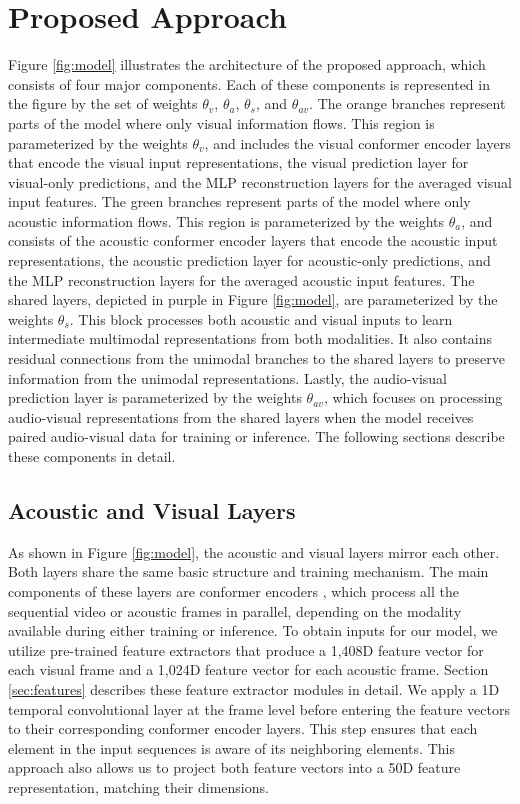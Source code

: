 \documentclass{article}
\begin{document}
\section{Proposed Approach}
\label{sec:ProposedApproach}

Figure \ref{fig:model} illustrates the architecture of the proposed approach, which consists of four major components. Each of these components is represented in the figure by the set of weights $\theta_v$, $\theta_a$, $\theta_s$, and $\theta_{av}$. The orange branches represent parts of the model where only visual information flows. This region is parameterized by the weights $\theta_v$, and includes the visual conformer encoder layers that encode the visual input representations, the visual prediction layer for visual-only predictions, and the MLP reconstruction layers for the averaged visual input features. The green branches represent parts of the model where only acoustic information flows. This region is parameterized by the weights $\theta_a$, and consists of the acoustic conformer encoder layers that encode the acoustic input representations, the acoustic prediction layer for acoustic-only predictions, and the MLP reconstruction layers for the averaged acoustic input features. The shared layers, depicted in purple in Figure \ref{fig:model}, are parameterized by the weights $\theta_s$. This block processes both acoustic and visual inputs to learn intermediate multimodal representations from both modalities. It also contains residual connections from the unimodal branches to the shared layers to preserve information from the unimodal representations. Lastly, the audio-visual prediction layer is parameterized by the weights $\theta_{av}$, which focuses on processing audio-visual representations from the shared layers when the model receives paired audio-visual data for training or inference. The following sections describe these components in detail.

\subsection{Acoustic and Visual Layers}
\label{ssec:acousticvisual}

As shown in Figure \ref{fig:model}, the acoustic and visual layers mirror each other. Both layers share the same basic structure and training mechanism. The main components of these layers are conformer encoders \cite{gulati_2020}, which process all the sequential video or acoustic frames in parallel, depending on the modality available during either training or inference. To obtain inputs for our model, we utilize pre-trained feature extractors that produce a 1,408D feature vector for each visual frame and a 1,024D feature vector for each acoustic frame. Section \ref{sec:features} describes these feature extractor modules in detail. We apply a 1D temporal convolutional layer at the frame level before entering the feature vectors to their corresponding conformer encoder layers. This step ensures that each element in the input sequences is aware of its neighboring elements. This approach also allows us to project both feature vectors into a 50D feature representation, matching their dimensions. 
\end{document}
